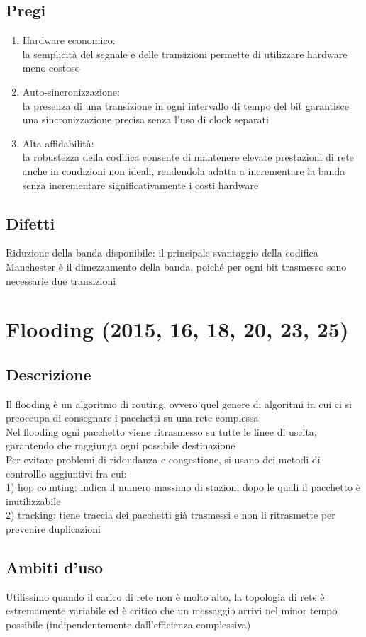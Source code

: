 \documentclass[10pt,oneside,a4paper]{article}
\begin{document}
\subsection{Pregi}
\begin{enumerate}
\item Hardware economico:\\
la semplicità del segnale e delle transizioni permette di utilizzare hardware meno costoso
\item Auto-sincronizzazione:\\
la presenza di una transizione in ogni intervallo di tempo del bit garantisce una sincronizzazione precisa senza l'uso di clock separati
\item Alta affidabilità:\\
la robustezza della codifica consente di mantenere elevate prestazioni di rete anche in condizioni non ideali, rendendola adatta a incrementare la banda senza incrementare significativamente i costi hardware
\end{enumerate}
\subsection{Difetti}
Riduzione della banda disponibile: il principale svantaggio della codifica Manchester è il dimezzamento della banda, poiché per ogni bit trasmesso sono necessarie due transizioni
\section{Flooding (2015, 16, 18, 20, 23, 25)}
\subsection{Descrizione}
Il flooding è un algoritmo di routing, ovvero quel genere di algoritmi in cui ci si preoccupa di consegnare i pacchetti su una rete complessa\\
Nel flooding ogni pacchetto viene ritrasmesso su tutte le linee di uscita, garantendo che raggiunga ogni possibile destinazione\\
Per evitare problemi di ridondanza e congestione, si usano dei metodi di controlllo aggiuntivi fra cui:\\
1) hop counting: indica il numero massimo di stazioni dopo le quali il pacchetto è inutilizzabile\\
2) tracking: tiene traccia dei pacchetti già trasmessi e non li ritrasmette per prevenire duplicazioni
\subsection{Ambiti d'uso}
Utilissimo quando il carico di rete non è molto alto, la topologia di rete è estremamente variabile ed è critico che un messaggio arrivi nel minor tempo possibile (indipendentemente dall'efficienza complessiva)
\end{document}
